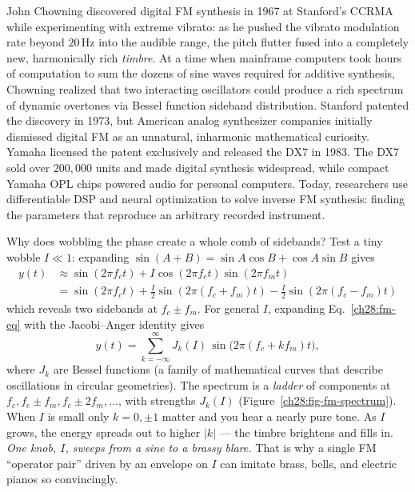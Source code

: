 \begin{historybox}
John Chowning discovered digital FM synthesis in 1967 at Stanford's CCRMA while
experimenting with extreme vibrato: as he pushed the vibrato modulation rate beyond $20$\,Hz
into the audible range, the pitch flutter fused into a completely new, harmonically rich
\emph{timbre}. At a time when mainframe computers took hours of computation to sum the
dozens of sine waves required for additive synthesis, Chowning realized that two
interacting oscillators could produce a rich spectrum of dynamic overtones via Bessel
function sideband distribution. Stanford patented the discovery in 1973, but American
analog synthesizer companies initially dismissed digital FM as an unnatural, inharmonic
mathematical curiosity. Yamaha licensed the patent exclusively and released the DX7 in 1983.
The DX7 sold over $200{,}000$ units and made digital synthesis widespread, while compact Yamaha OPL chips powered audio for personal computers. Today, researchers use differentiable DSP and neural optimization to solve inverse FM synthesis: finding the parameters that reproduce an arbitrary recorded instrument.
\end{historybox}

\begin{whybox}
Why does wobbling the phase create a whole comb of sidebands? Test a tiny wobble $I \ll 1$: expanding $\sin(A+B)=\sin A\cos B+\cos A\sin B$ gives
\begin{align*}
y(t)&\approx\sin(2\pi f_c t)+I\cos(2\pi f_c t)\sin(2\pi f_m t) \\
&= \sin(2\pi f_c t) + \tfrac{I}{2}\sin(2\pi(f_c+f_m)t) - \tfrac{I}{2}\sin(2\pi(f_c-f_m)t)
\end{align*}
which reveals two sidebands at $f_c\pm f_m$. For general $I$, expanding
Eq.~\eqref{ch28:fm-eq} with the Jacobi--Anger identity gives
\[
y(t)=\sum_{k=-\infty}^{\infty} J_k(I)\,\sin\!\bigl(2\pi(f_c+k f_m)t\bigr),
\]
where $J_k$ are Bessel functions (a family of mathematical curves that describe oscillations in circular geometries). The spectrum is a \emph{ladder} of components
at $f_c, f_c\pm f_m, f_c\pm 2f_m, \dots$, with strengths $J_k(I)$
(Figure~\ref{ch28:fig-fm-spectrum}). When $I$ is
small only $k=0,\pm1$ matter and you hear a nearly pure tone. As $I$ grows, the
energy spreads out to higher $|k|$ --- the timbre brightens and fills in.
\emph{One knob, $I$, sweeps from a sine to a brassy blare.} That is why a single
FM ``operator pair'' driven by an envelope on $I$ can imitate brass, bells, and
electric pianos so convincingly.
\end{whybox}

